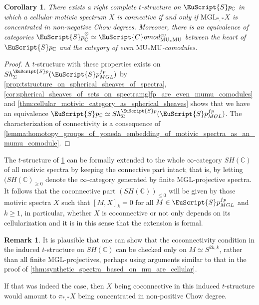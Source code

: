 \documentclass[oneside,a4paper]{amsart}
\newcommand{\euscr}[1]{\EuScript{#1}} %
\newcommand{\MU}{\mathrm{MU}} %
\newcommand{\MGL}{\mathrm{MGL}} %
\newcommand{\spectra}{\euscr{S}p} %
\newcommand{\cspectra}{\euscr{S}p_{\mathbb{C}}} %
\newcommand{\spectramglfp}{\spectra_{MGL}^{fp}} %
\newcommand{\Comod}{\euscr{C}omod} %
\newcommand{\ComodMU}{\Comod_{\MU_{*}\MU}} %
\theoremstyle{plain}
\newtheorem{cor}[thm]{Corollary}
\theoremstyle{definition}
\newtheorem{rem}[thm]{Remark}
\theoremstyle{remark}
\begin{document}
\begin{cor}
\label{cor:mgl_induced_t_structure_on_cellular_motivic_spectra}
There exists a right complete $t$-structure on $\cspectra$ in which a cellular motivic spectrum $X$ is connective if and only if $\MGL_{*, *} X$ is concentrated in non-negative Chow degrees. Moreover, there is an equivalence of categories $\cspectra^{\heartsuit} \simeq \ComodMU^{ev}$ between the heart of $\cspectra$ and the category of even $\MU_{*}\MU$-comodules.
\end{cor}

\begin{proof}
A $t$-structure with these properties exists on $Sh_{\Sigma}^{\spectra}(\spectramglfp)$ by \cref{prop:tstructure_on_spherical_sheaves_of_spectra},  \cref{cor:spherical_sheaves_of_sets_on_spectramglfp_are_even_mumu_comodules} and \cref{thm:cellular_motivic_category_as_spherical_sheaves} shows that we have an equivalence $\cspectra \simeq Sh_{\Sigma}^{\spectra}(\spectramglfp)$. The characterization of connectivity is a consequence of \cref{lemma:homotopy_groups_of_yoneda_embedding_of_motivic_spectra_as_an_mumu_comodule}. 
\end{proof}

The $t$-structure of \cref{cor:mgl_induced_t_structure_on_cellular_motivic_spectra} can be formally extended to the whole $\infty$-category $SH(\mathbb{C})$ of all motivic spectra by keeping the connective part intact; that is, by letting $(SH(\mathbb{C})_{\geq 0}$ denote the $\infty$-category generated by finite $\MGL$-projective spectra. It follows that the coconnective part $(SH(\mathbb{C}))_{\leq 0}$ will be given by those motivic spectra $X$ such that $[M, X]_{k} = 0$ for all $M \in \spectramglfp$ and $k \geq 1$, in particular, whether $X$ is coconnective or not only depends on its cellularization and it is in this sense that the extension is formal. 

\begin{rem}
It is plausible that one can show that the coconnectivity condition in the induced $t$-structure on $SH(\mathbb{C})$ can be checked only on $M \simeq S^{2k, k}$, rather than all finite $\MGL$-projectives, perhaps using arguments similar to that in the proof of \cref{thm:synthetic_spectra_based_on_mu_are_cellular}. 

If that was indeed the case, then $X$ being coconnective in this induced $t$-structure would amount to $\pi_{*, *} X$ being concentrated in non-positive Chow degree. 
\end{rem}
\end{document}
